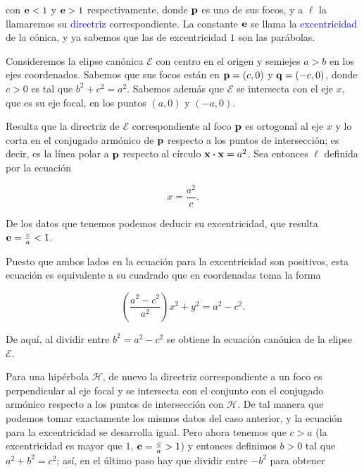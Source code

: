 \documentclass{article}
\theoremstyle{definicion}
\theoremstyle{definition}             %
\theoremstyle{definition}             %
\theoremstyle{definition}
\theoremstyle{definition}
\theoremstyle{observacion}
\theoremstyle{definition}
\theoremstyle{plain}
\theoremstyle{definition}
\theoremstyle{afirmacion}
\theoremstyle{notation}
\theoremstyle{definition}
\begin{document}
    con \(\vb{e} < 1\) y \(\vb{e} > 1\) respectivamente, donde \(\vb{p}\) es uno de sus focos, y a \(\ell\) la llamaremos su \textcolor{blue}{directriz} correspondiente. La constante \(\vb{e}\) se llama la \textcolor{blue}{excentricidad} de la cónica, y ya sabemos que las de excentricidad \(1\) son las parábolas.

    Consideremos la elipse canónica \(\mathcal{E}\) con centro en el origen y semiejes \(a > b\) en los ejes coordenados. Sabemos que sus focos están en \(\vb{p} = (c, 0)\) y \(\vb{q} = (-c, 0)\), donde \(c > 0\) es tal que \(b^{2} + c^{2} = a^{2}\). Sabemos además que \(\mathcal{E}\) se intersecta con el eje \(x\), que es su eje focal, en los puntos \((a, 0)\) y \((-a, 0)\).

    Resulta que la directriz de \(\mathcal{E}\) correspondiente al foco \(\vb{p}\) es ortogonal al eje \(x\) y lo corta en el conjugado armónico de \(\vb{p}\) respecto a los puntos de intersección; es decir, es la línea polar a \(\vb{p}\) respecto al círculo \(\vb{x} \vdot \vb{x} = a^{2}\). Sea entonces \(\ell\) definida por la ecuación

    \begin{equation*}
        x =  \dfrac{a^{2}}{c}.
    \end{equation*}

    De los datos que tenemos podemos deducir su excentricidad, que resulta \(\vb{e} = \frac{c}{a} < 1\).

    Puesto que ambos lados en la ecuación para la excentricidad son positivos, esta ecuación es equivalente a su cuadrado que en coordenadas toma la forma

    \begin{equation*}
        \left(\dfrac{a^{2} - c^{2}}{a^{2}}\right)x^{2} + y^{2} = a^{2} - c^{2}.
    \end{equation*}

    De aquí, al dividir entre \(b^{2} = a^{2} - c^{2}\) se obtiene la ecuación canónica de la elipse \(\mathcal{E}\).

    Para una hipérbola \(\mathcal{H}\), de nuevo la directriz correspondiente a un foco es perpendicular al eje focal y se intersecta con el conjunto con el conjugado armónico respecto a los puntos de intersección con \(\mathcal{H}\). De tal manera que podemos tomar exactamente los mismos datos del caso anterior, y la ecuación para la excentricidad se desarrolla igual. Pero ahora tenemos que \(c > a\) (la excentricidad es mayor que \(1\), \(\vb{e} = \frac{c}{a} > 1\)) y entonces definimos \(b > 0\) tal que \(a^{2} + b^{2} = c^{2}\); así, en el último paso hay que dividir entre \(-b^{2}\) para obtener
\end{document}
